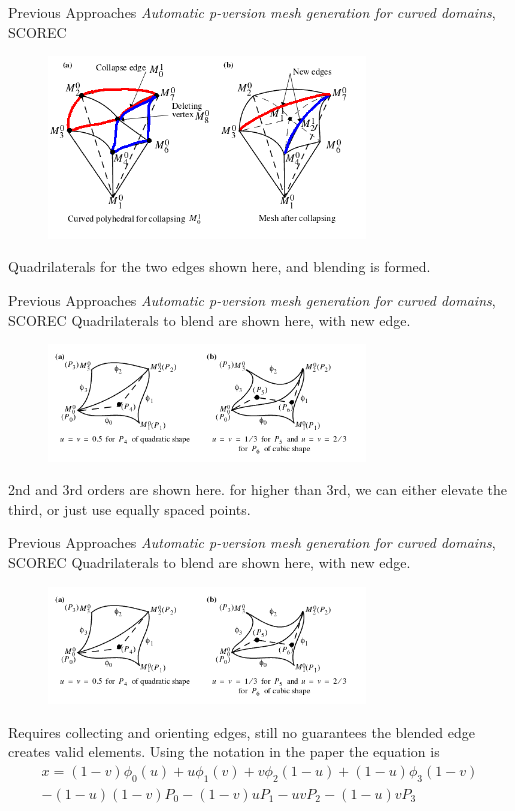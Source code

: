 \documentclass[12pt]{beamer}
\newcommand{\spa}{\vspace{0.5cm}\newline}
\begin{document}
\begin{frame}{Previous Approaches}
\textit{Automatic p-version mesh generation for curved domains}, SCOREC
\begin{figure}
  \centering
  \includegraphics[width=0.75\textwidth]{bezier_images/collapseOld3.png} 
\end{figure}
Quadrilaterals for the two edges shown here, and blending is formed. 
\end{frame}
\begin{frame}{Previous Approaches}
\textit{Automatic p-version mesh generation for curved domains}, SCOREC \spa
Quadrilaterals to blend are shown here, with new edge.
\begin{figure}
  \centering
  \includegraphics[width=0.75\textwidth]{bezier_images/collapseOld4.png} 
\end{figure}
2nd and 3rd orders are shown here. for higher than 3rd, we can either elevate the third, or just use equally spaced points.
\end{frame}
\begin{frame}{Previous Approaches}
\textit{Automatic p-version mesh generation for curved domains}, SCOREC \spa
Quadrilaterals to blend are shown here, with new edge.
\begin{figure}
  \centering
  \includegraphics[width=0.75\textwidth]{bezier_images/collapseOld4.png} 
\end{figure}
Requires collecting and orienting edges, still no guarantees the blended edge creates valid elements. Using the notation in the paper the equation is
{\footnotesize
\begin{eqnarray*}
x = (1-v)\phi_0(u)+u\phi_1(v)+v\phi_2(1-u)+(1-u)\phi_3(1-v) \\
- (1-u)(1-v)P_0 - (1-v)uP_1 - uvP_2 -(1-u)vP_3 
\end{eqnarray*}
}
\end{frame}
\end{document}
